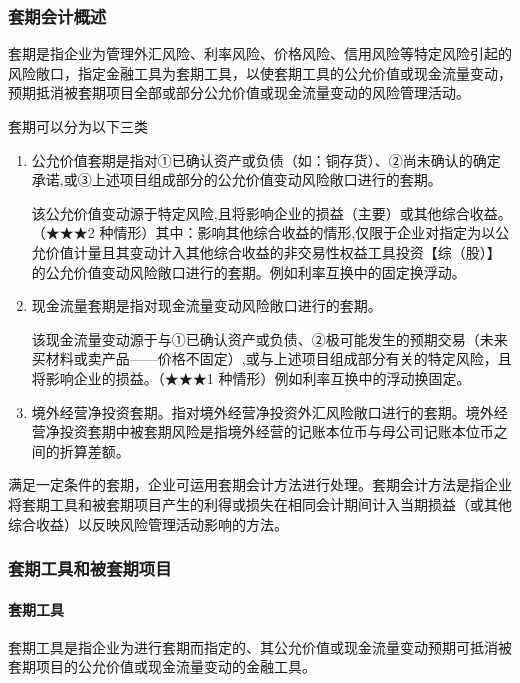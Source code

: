 \documentclass[UTF8,12pt]{ctexart}
\numberwithin{equation}{section} %
\numberwithin{figure}{section}
\numberwithin{table}{section}
\begin{document}
	\subsubsection{套期会计概述}
	套期是指企业为管理外汇风险、利率风险、价格风险、信用风险等特定风险引起的风险敞口，指定金融工具为套期工具，以使套期工具的公允价值或现金流量变动，预期抵消被套期项目全部或部分公允价值或现金流量变动的风险管理活动。
	
	套期可以分为以下三类
	\begin{enumerate}
		\item 公允价值套期是指对①已确认资产或负债（如：铜存货）、②尚未确认的确定承诺,或③上述项目组成部分的公允价值变动风险敞口进行的套期。
		
		该公允价值变动源于特定风险,且将影响企业的损益（主要）或其他综合收益。（★★★2 种情形）其中：影响其他综合收益的情形,仅限于企业对指定为以公允价值计量且其变动计入其他综合收益的非交易性权益工具投资【综（股）】的公允价值变动风险敞口进行的套期。例如利率互换中的固定换浮动。
		
		\item 现金流量套期是指对现金流量变动风险敞口进行的套期。
		
		该现金流量变动源于与①已确认资产或负债、②极可能发生的预期交易（未来买材料或卖产品——价格不固定）,或与上述项目组成部分有关的特定风险，且将影响企业的损益。（★★★1 种情形）例如利率互换中的浮动换固定。
		
		\item 境外经营净投资套期。指对境外经营净投资外汇风险敞口进行的套期。境外经营净投资套期中被套期风险是指境外经营的记账本位币与母公司记账本位币之间的折算差额。
	\end{enumerate}

	满足一定条件的套期，企业可运用套期会计方法进行处理。套期会计方法是指企业将套期工具和被套期项目产生的利得或损失在相同会计期间计入当期损益（或其他综合收益）以反映风险管理活动影响的方法。
	
	
	\subsubsection{套期工具和被套期项目}
	\paragraph{套期工具}套期工具是指企业为进行套期而指定的、其公允价值或现金流量变动预期可抵消被套期项目的公允价值或现金流量变动的金融工具。
	
\end{document}
